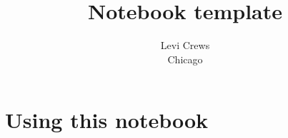 \documentclass{report}
\title{Notebook template}
\author{
Levi Crews \\ {Chicago}
}
\date{}
\numberwithin{equation}{section}
\numberwithin{figure}{section}
\numberwithin{table}{section}
\begin{document}
\maketitle

\renewcommand{\thechapter}{\Alph{chapter}}
\setcounter{tocdepth}{1}
\tableofcontents
\etocsettocstyle{}{} %

\chapter{Using this notebook}

\end{document}
